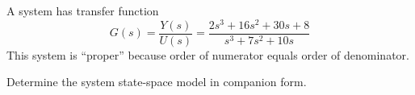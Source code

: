 A system has transfer function
\[G(s)=\frac{Y(s)}{U(s)}=\frac{2s^3 + 16s^2 + 30s + 8}{s^3 + 7s^2 + 10s}\]
This system is ``proper'' because order of numerator equals order of denominator.

Determine the system state-space model in companion form.
\endinput
